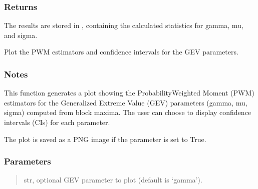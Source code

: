 \documentclass[a4paper,11pt,openany,english]{sphinxmanual}
\begin{document}
\begin{fulllineitems}
\begin{fulllineitems}
\subsubsection{Returns}
\label{\detokenize{api_topt:id39}}\begin{description}
\sphinxAtStartPar
The results are stored in , containing the calculated statistics for gamma, mu, and sigma.

\end{description}

\end{fulllineitems}


\begin{fulllineitems}
\label{\detokenize{api_topt:xtremes.topt.PWM_estimators.plot}}
\pysigstartsignatures
{}
\pysigstopsignatures
\sphinxAtStartPar
Plot the PWM estimators and confidence intervals for the GEV parameters.


\subsubsection{Notes}
\label{\detokenize{api_topt:id40}}
\sphinxAtStartPar
This function generates a plot showing the Probability\sphinxhyphen{}Weighted Moment (PWM) estimators for the Generalized Extreme Value (GEV) parameters 
(gamma, mu, sigma) computed from block maxima. The user can choose to display confidence intervals (CIs) for each parameter.

\sphinxAtStartPar
The plot is saved as a PNG image if the  parameter is set to True.


\subsubsection{Parameters}
\label{\detokenize{api_topt:id41}}\begin{quote}\begin{description}
\sphinxAtStartPar
str, optional
GEV parameter to plot (default is ‘gamma’).


\end{description}
\end{quote}
\end{fulllineitems}
\end{fulllineitems}
\end{document}
